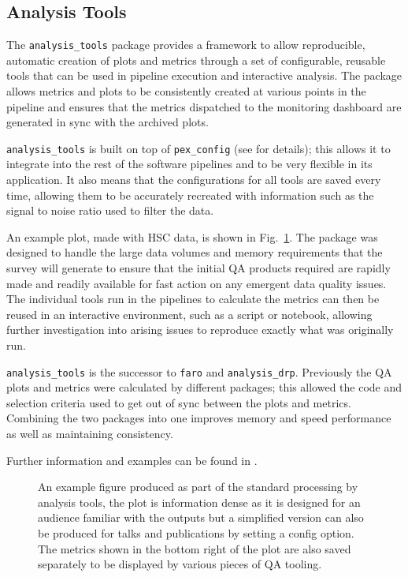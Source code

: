 \subsection{Analysis Tools}

The \texttt{analysis\_tools} package provides a framework to allow reproducible, automatic creation of plots and metrics through a set of configurable, reusable tools that can be used in pipeline execution and interactive analysis.
The package allows metrics and plots to be consistently created at various points in the pipeline and ensures that the metrics dispatched to the monitoring dashboard are generated in sync with the archived plots.

\texttt{analysis\_tools} is built on top of \texttt{pex\_config} (see  for details); this allows it to integrate into the rest of the software pipelines and to be very flexible in its application.
It also means that the configurations for all tools are saved every time, allowing them to be accurately recreated with information such as the signal to noise ratio used to filter the data.

An example plot, made with HSC data, is shown in Fig.~\ref{fig:atools}.
The package was designed to handle the large data volumes and memory requirements that the survey will generate to ensure that the initial QA products required are rapidly made and readily available for fast action on any emergent data quality issues.
The individual tools run in the pipelines to calculate the metrics can then be reused in an interactive environment, such as a script or notebook, allowing further investigation into arising issues to reproduce exactly what was originally run.

\texttt{analysis\_tools} is the successor to \texttt{faro} \citep{2022SPIE12189E..0MG} and \texttt{analysis\_drp}.
Previously the QA plots and metrics were calculated by different packages; this allowed the code and selection criteria used to get out of sync between the plots and metrics.
Combining the two packages into one improves memory and speed performance as well as maintaining consistency.

Further information and examples can be found in \citet{DMTN-314}.

\begin{figure}[h]
\caption{An example figure produced as part of the standard processing by analysis tools, the plot is information dense as it is designed for an audience familiar with the outputs but a simplified version can also be produced for talks and publications by setting a config option.
The metrics shown in the bottom right of the plot are also saved separately to be displayed by various pieces of QA tooling.}
\label{fig:atools}
\end{figure}
